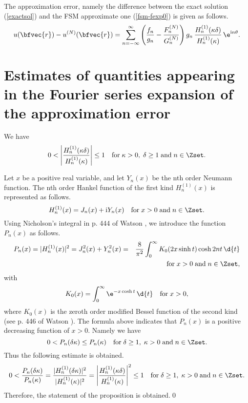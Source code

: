 The approximation error, namely the difference between the exact solution (\ref{exactsol}) and the FSM approximate one (\ref{fsm-fexp0}) is given as follows.
\begin{equation}
\label{difference}
\displaystyle u(\bfvec{r})-u^{(N)}(\bfvec{r})=\sum^{\infty}_{n=-\infty} \left(\frac{f_n}{g_n}-\frac{F^{(N)}_n}{G^{(N)}_n}\right)g_n \,\frac{H^{(1)}_n(\kappa \delta)}{H^{(1)}_n(\kappa)}\,\e^{\mathrm{i} n \theta}.
\end{equation}

\section{Estimates of quantities appearing in the Fourier series expansion of the approximation error}
\label{partition}

\begin{prop}
\label{eprop1} We have
\begin{displaymath}
0<\left|\frac{H^{(1)}_n(\kappa \delta)}{H^{(1)}_n(\kappa)}\right| \le 1 \quad {\rm for}\; \kappa>0,\;\delta \ge 1 \;{\rm and}\; n \in \Zset.
\end{displaymath}
\end{prop}
\begin{pf}
Let $x$ be a positive real variable, and let $Y_n(x)$ be the nth order Neumann function. The nth order Hankel function of the first kind $H^{(1)}_n(x)$ is represented as follows.
\begin{displaymath}
H^{(1)}_n(x) = J_n(x) + \mathrm{i} Y_n(x) \quad {\rm for}\; x>0 \;{\rm and}\; n \in \Zset.
\end{displaymath}
Using Nicholson's integral in p. 444 of Watson \cite{Watson1966}, we introduce the function $P_n(x)$ as follows.
\begin{eqnarray*}
\displaystyle P_n(x)=|H^{(1)}_n(x)|^2=J^2_n(x)+Y^2_n(x)&=&\displaystyle \frac{8}{\pi^2}\int^{\infty}_{0} K_0(2x \sinh t)\cosh 2 n t \, \d{t} \\
&&  {\rm for}\;x>0 \;{\rm and}\; n \in \Zset,
\end{eqnarray*}
with
\begin{displaymath}
\displaystyle K_0(x)=\int^{\infty}_0 \e^{-x \cosh t} \, \d{t} \quad {\rm for}\; x>0,
\end{displaymath}
where $K_0(x)$ is the zeroth order modified Bessel function of the second kind (see p. 446 of Watson \cite{Watson1966}).
The formula above indicates that $P_n(x)$ is a positive decreasing function of $x>0$. Namely we have
\begin{displaymath}
0<P_n(\delta \kappa) \le P_n(\kappa) \quad {\rm for}\;\delta \ge 1,\;\kappa>0 \;{\rm and}\; n\in\Zset.
\end{displaymath}
Thus the following estimate is obtained.
\begin{displaymath}
0<\frac{P_n(\delta \kappa)}{P_n(\kappa)}=\frac{|H^{(1)}_n(\delta \kappa)|^2}{|H^{(1)}_n(\kappa)|^2}=\left|\frac{H^{(1)}_n(\kappa \delta)}{H^{(1)}_n(\kappa)}\right|^2 \le 1 \quad {\rm for}\;\delta \ge 1,\;\kappa>0 \;{\rm and}\; n\in\Zset.
\end{displaymath}
Therefore, the statement of the proposition is obtained.\qed
\end{pf}

